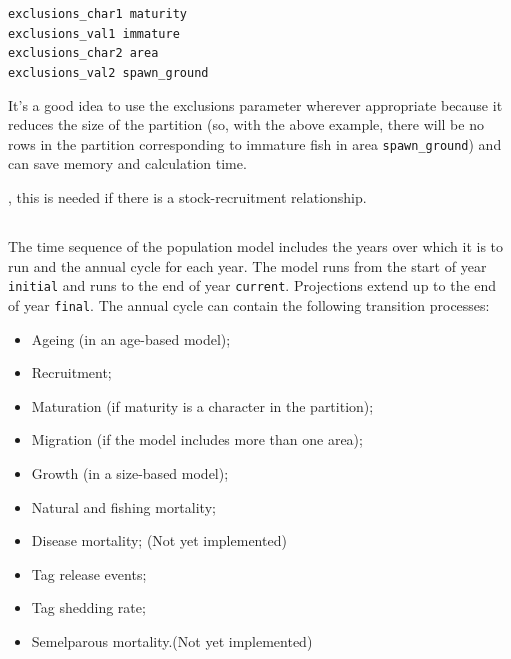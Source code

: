 \texttt{exclusions\_char1 maturity}\\
\texttt{exclusions\_val1 immature}\\
\texttt{exclusions\_char2 area}\\
\texttt{exclusions\_val2 spawn\_ground}

It’s a good idea to use the exclusions parameter wherever appropriate because it reduces the size of the partition (so, with the above example, there will be no rows in the partition corresponding to immature fish in area \texttt{spawn\_ground}) and can save memory and calculation time.

 , this is needed if there is a stock-recruitment relationship. 

\subsection{}

The time sequence of the population model includes the years over which it is to run and the annual cycle for each year. The model runs from the start of year \texttt{initial} and runs to the end of year \texttt{current}. Projections extend up to the end of year \texttt{final}. The annual cycle can contain the following transition processes: 

\begin{itemize}
\item	Ageing (in an age-based model);
\item	Recruitment;
\item	Maturation (if maturity is a character in the partition);
\item	Migration (if the model includes more than one area);
\item	Growth (in a size-based model);
\item	Natural and fishing mortality;
\item	Disease mortality; (Not yet implemented)
\item	Tag release events;
\item	Tag shedding rate;
\item	Semelparous mortality.(Not yet implemented)
\end{itemize}

